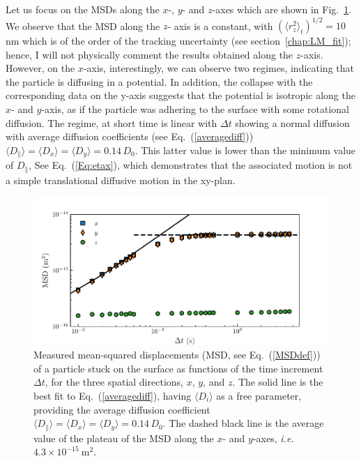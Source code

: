 Let us focus on the \gls{MSD}s along the $x$-, $y$- and $z$-axes which are shown in Fig.~\ref{fig.MSD_stucked}. We observe that the \gls{MSD} along the $z$- axis is a constant, with $(\langle r_z^2 \rangle_t)^{1/2} = 10 $~ nm which is of the order of the tracking uncertainty (see section~\ref{chap:LM_fit}); hence, I will not physically comment the results obtained along the $z$-axis. However, on the $x$-axis, interestingly, we can observe two regimes, indicating that the particle is diffusing in a potential. In addition, the collapse with the corresponding data on the y-axis suggests that the potential is isotropic along the $x$- and $y$-axis, as if the particle was adhering to the surface with some rotational diffusion. The regime, at short time is linear with $\Delta t$ showing a normal diffusion with  average diffusion coefficients (see Eq.~(\ref{averagediff}))  $\langle{D_\parallel}\rangle= \langle D_x\rangle=\langle D_y \rangle =0.14\,D_0$. This latter value is lower than the minimum value of $D_\parallel$, See Eq.~(\ref{Eq:etax}), which demonstrates that the associated motion is not a simple translational diffusive motion in the xy-plan.



\begin{figure}[H]
	\centering
	\includegraphics{02_body/chapter4/images/stucked_particle/MSD_stucked.pdf}
	\caption{Measured mean-squared displacements (MSD, see Eq.~(\ref{MSDdef})) of a particle stuck on the surface  as functions of the time increment $\Delta t$, for the three spatial directions, $x$, $y$, and $z$. The solid line is the best fit to Eq.~(\ref{averagediff}), having $\langle D_i \rangle$ as a free parameter,
		providing the average diffusion coefficient $\langle{D_\parallel}\rangle= \langle D_x\rangle=\langle D_y \rangle =0.14\,D_0$. The dashed black line is the average value of the plateau of the MSD along the $x$- and $y$-axes, \textit{i.e.} $ 4.3 \times 10 ^{-15} ~ \mathrm{m^2}$.~\href{https://github.com/eXpensia/Confined-Brownian-Motion/blob/main/02_body/chapter4/images/stucked_particle/Full\%20analysis\%20trajectory_using_Dyacine_adding_x_y_distrib.ipynb}{\faGithub}}
	\label{fig.MSD_stucked}
\end{figure}

